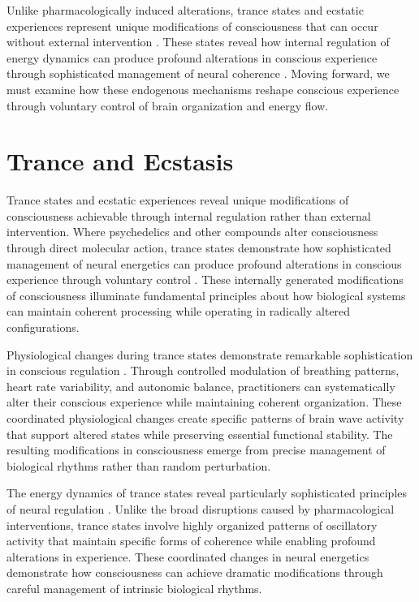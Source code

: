 \begin{refsection}
Unlike pharmacologically induced alterations, trance states and ecstatic experiences represent unique modifications of consciousness that can occur without external intervention \cite{Eliade1964}. These states reveal how internal regulation of energy dynamics can produce profound alterations in conscious experience through sophisticated management of neural coherence \cite{Farthing1992}. Moving forward, we must examine how these endogenous mechanisms reshape conscious experience through voluntary control of brain organization and energy flow.

\section{Trance and Ecstasis}

Trance states and ecstatic experiences reveal unique modifications of consciousness achievable through internal regulation rather than external intervention. Where psychedelics and other compounds alter consciousness through direct molecular action, trance states demonstrate how sophisticated management of neural energetics can produce profound alterations in conscious experience through voluntary control \cite{Rouget1985}. These internally generated modifications of consciousness illuminate fundamental principles about how biological systems can maintain coherent processing while operating in radically altered configurations.

Physiological changes during trance states demonstrate remarkable sophistication in conscious regulation \cite{Becker2004}. Through controlled modulation of breathing patterns, heart rate variability, and autonomic balance, practitioners can systematically alter their conscious experience while maintaining coherent organization. These coordinated physiological changes create specific patterns of brain wave activity that support altered states while preserving essential functional stability. The resulting modifications in consciousness emerge from precise management of biological rhythms rather than random perturbation.

The energy dynamics of trance states reveal particularly sophisticated principles of neural regulation \cite{Lewis2003}. Unlike the broad disruptions caused by pharmacological interventions, trance states involve highly organized patterns of oscillatory activity that maintain specific forms of coherence while enabling profound alterations in experience. These coordinated changes in neural energetics demonstrate how consciousness can achieve dramatic modifications through careful management of intrinsic biological rhythms.


\end{refsection}
